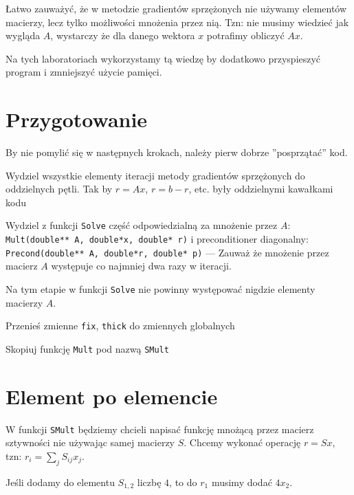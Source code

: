 \documentclass{instrukcja}
\begin{document}
\author{Ł. Łaniewski-Wołłk}
\materialtitle

Łatwo zauważyć, że w metodzie gradientów sprzężonych nie używamy elementów macierzy, lecz tylko możliwości mnożenia przez nią. Tzn: nie musimy wiedzieć jak wygląda $A$, wystarczy że dla danego wektora $x$ potrafimy obliczyć $Ax$.

Na tych laboratoriach wykorzystamy tą wiedzę by dodatkowo przyspieszyć program i zmniejszyć użycie pamięci.

\section{Przygotowanie}

By nie pomylić się w następnych krokach, należy pierw dobrze ''posprzątać'' kod. 
\begin{zad} Wydziel wszystkie elementy iteracji metody gradientów sprzężonych do oddzielnych pętli. Tak by $r=Ax$, $r=b-r$, etc. były oddzielnymi kawałkami kodu\end{zad}
\begin{zad} Wydziel z funkcji {\tt Solve} część odpowiedzialną za mnożenie przez $A$: {\tt Mult(double** A, double*x, double* r)} i preconditioner diagonalny: {\tt Precond(double** A, double*r, double* p)} --- Zauważ że mnożenie przez macierz $A$ występuje co najmniej dwa razy w iteracji.\end{zad}

Na tym etapie w funkcji {\tt Solve} nie powinny występować nigdzie elementy macierzy $A$.

\begin{zad} Przenieś zmienne {\tt fix}, {\tt thick} do zmiennych globalnych\end{zad}

\begin{zad}Skopiuj funkcję {\tt Mult} pod nazwą {\tt SMult}\end{zad}

\section{Element po elemencie}
W funkcji {\tt SMult} będziemy chcieli napisać funkcję mnożącą przez macierz sztywności nie używając samej macierzy $S$. Chcemy wykonać operację $r=Sx$, tzn: $r_i = \sum_jS_{ij}x_j$.

Jeśli dodamy do elementu $S_{1,2}$ liczbę $4$, to do $r_1$ musimy dodać $4x_2$.
\end{document}
